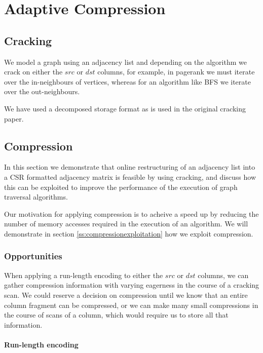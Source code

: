\chapter{Adaptive Compression}

\label{ch:adaptivecompression}

\section{Cracking}

We model a graph using an adjacency list and depending on the algorithm we crack on either the $src$
or $dst$ columns, for example, in pagerank we must iterate over the in-neighbours of vertices,
whereas for an algorithm like BFS we iterate over the out-neighbours.

We have used a decomposed storage format as is used in the original cracking paper.

\section{Compression}

In this section we demonstrate that online restructuring of an adjacency list into a CSR formatted 
adjacency matrix is feasible by using cracking, and discuss how this can be exploited to improve the
performance of the execution of graph traversal algorithms.

Our motivation for applying compression is to acheive a speed up by reducing the number of memory
accesses required in the execution of an algorithm. We will demonstrate in section
\ref{ss:compressionexploitation} how we exploit compression.

\subsection{Opportunities}

When applying a run-length encoding to either the $src$ or $dst$ columns, we can gather compression
information with varying eagerness in the course of a cracking scan. We could reserve a decision on
compression until we know that an entire column fragment can be compressed, or we can make
many small compressions in the course of scans of a column, which would require us to store all that
information.

\subsubsection{Run-length encoding}

